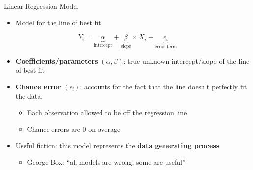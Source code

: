 \documentclass[
  ignorenonframetext,
]{beamer}
\providecommand{\tightlist}{%
  \setlength{\itemsep}{0pt}\setlength{\parskip}{0pt}}
\begin{document}
\begin{frame}{Linear Regression Model}
\label{linear-regression-model}
\begin{itemize}
\tightlist
\item
  Model for the line of best fit
\end{itemize}

\[
Y_i = \underbrace{\alpha}_{\textrm{intercept}} + \underbrace{\beta}_{\textrm{slope}} \times X_i + \underbrace{\epsilon_i}_{\textrm{error term}}
\] \pause

\begin{itemize}
\tightlist
\item
  \textbf{Coefficients/parameters} \((\alpha,\beta)\): true unknown
  intercept/slope of the line of best fit \pause
\item
  \textbf{Chance error} \((\epsilon_i)\): accounts for the fact that the
  line doesn't perfectly fit the data. \pause

  \begin{itemize}
  \tightlist
  \item
    Each observation allowed to be off the regression line
  \item
    Chance errors are 0 on average \pause
  \end{itemize}
\item
  Useful fiction: this model represents the \textbf{data generating
  process}

  \begin{itemize}
  \tightlist
  \item
    George Box: ``all models are wrong, some are useful''
  \end{itemize}
\end{itemize}
\end{frame}
\end{document}
